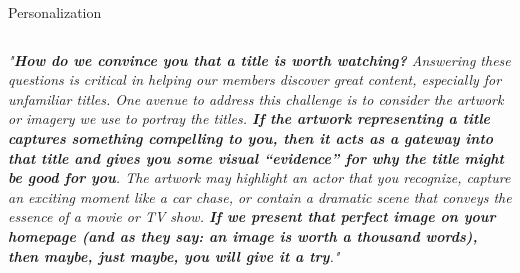 \documentclass[main.tex]{subfiles}
\begin{document}
    \begin{frame}{Personalization}
        \begin{columns}
            \begin{column}{.6\textwidth}
                \begin{justify}
                    \textit{"\textbf{How do we convince you that a title is worth watching?} Answering these questions is critical in helping our members discover great content, especially for unfamiliar titles. One avenue to address this challenge is to consider the artwork or imagery we use to portray the titles. \textbf{If the artwork representing a title captures something compelling to you, then it acts as a gateway into that title and gives you some visual “evidence” for why the title might be good for you}. The artwork may highlight an actor that you recognize, capture an exciting moment like a car chase, or contain a dramatic scene that conveys the essence of a movie or TV show. \textbf{If we present that perfect image on your homepage (and as they say: an image is worth a thousand words), then maybe, just maybe, you will give it a try}."}
                    \vspace*{1mm}
                    

\end{justify}
\end{column}
\end{columns}
\end{frame}
\end{document}
